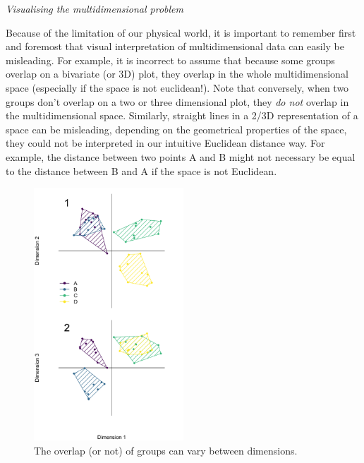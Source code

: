 \documentclass[12pt,letterpaper]{article}
\renewcommand{\subsection}[1]{%
\bigskip
\begin{center}
\begin{large}
\normalfont\itshape #1
\end{large}
\end{center}}
\begin{document}
\subsection{Visualising the multidimensional problem}
\label{visualisation}
Because of the limitation of our physical world, it is important to remember first and foremost that visual interpretation of multidimensional data can easily be misleading.
For example, it is incorrect to assume that because some groups overlap on a bivariate (or 3D) plot, they overlap in the whole multidimensional space (especially if the space is not euclidean!).
Note that conversely, when two groups don't overlap on a two or three dimensional plot, they \textit{do not} overlap in the multidimensional space.
Similarly, straight lines in a 2/3D representation of a space can be misleading, depending on the geometrical properties of the space, they could not be interpreted in our intuitive Euclidean distance way.
For example, the distance between two points A and B might not necessary be equal to the distance between B and A if the space is not Euclidean.

\begin{figure}[!htbp]
\centering
   \includegraphics[width=0.5\textwidth]{Figures/dimensionsOverlap.pdf}
\caption{\small{The overlap (or not) of groups can vary between dimensions.}}
\label{Fig:RF_results_best}
\end{figure}
\end{document}

